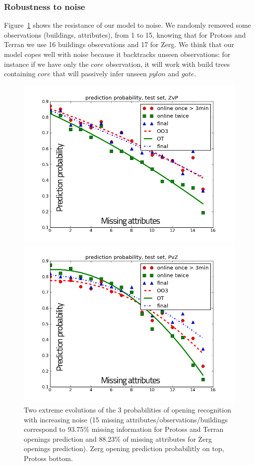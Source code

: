 \subsubsection{Robustness to noise}

Figure~\ref{fig:openingsnoise} shows the resistance of our model to noise. We randomly removed some observations (buildings, attributes), from 1 to 15, knowing that for Protoss and Terran we use 16 buildings observations and 17 for Zerg. We think that our model copes well with noise because it backtracks unseen observations: for instance if we have only the $core$ observation, it will work with build trees containing $core$ that will passively infer unseen $pylon$ and $gate$. 


\begin{figure}[h]
\centerline{\includegraphics[width=0.7\columnwidth]{images/ZvP2.png}}
\centerline{\includegraphics[width=0.7\columnwidth]{images/PvZ2.png}}
\caption{Two extreme evolutions of the 3 probabilities of opening recognition with increasing noise (15 missing attributes/observations/buildings correspond to 93.75\% missing information for Protoss and Terran openings prediction and 88.23\% of missing attributes for Zerg openings prediction). Zerg opening prediction probabilitly on top, Protoss bottom.}
\label{fig:openingsnoise}
\end{figure}

